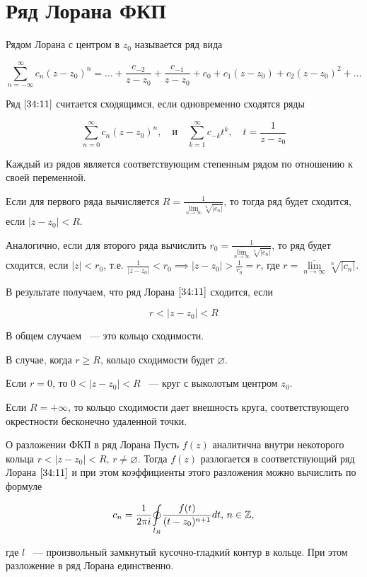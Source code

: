 \documentclass[../../main.tex]{subfiles}
\begin{document}
\section{Ряд Лорана ФКП}

Рядом Лорана с центром в $ z_0 $ называется ряд вида

\begin{equation}\label{34:11}
	\sum\limits_{n = -\infty}^{\infty}c_n(z - z_0)^n = \ldots + \frac{c_{-2}}{z - z_0} + \frac{c_{-1}}{z - z_0} + c_0 + c_1(z - z_0) + c_2(z - z_0)^2 + \ldots
\end{equation}

Ряд $ \eqref{34:11} $ считается сходящимся, если одновременно сходятся ряды 

\[ \sum\limits_{n = 0}^{\infty} c_n(z - z_0)^n, \quad \text{и} \quad \sum\limits_{k = 1}^{\infty} c_{-k}t^k, \quad t = \frac{1}{z - z_0} \]

Каждый из рядов является соответствующим степенным рядом по отношению к своей переменной.

Если для первого ряда вычисляется $ R = \frac{1}{\overline{\underset{n \to \infty}{\lim}} \sqrt[n]{|c_n|}} $, то тогда ряд будет сходится, если $ |z - z_0| < R $.

Аналогично, если для второго ряда вычислить $ r_0 = \frac{1}{\overline{\underset{n \to \infty}{\lim}} \sqrt[n]{|c_n|}} $, то ряд будет сходится, если $ |z| < r_0 $, т.е. $ \frac{1}{|z - z_0|} < r_0 \implies |z - z_0| > \frac{1}{r_0} = r $, где $ r = \overline{\underset{n \to \infty}{\lim}} \sqrt[n]{|c_n|} $.

В результате получаем, что ряд Лорана $ \eqref{34:11} $ сходится, если

\[ r < |z - z_0| < R \]

В общем случаем ~--- это кольцо сходимости.

В случае, когда $ r \geq R $, кольцо сходимости будет $ \varnothing $.

Если $r = 0$, то $ 0 < |z - z_0| < R $ ~--- круг с выколотым центром $z_0$.

Если $ R = +\infty $, то кольцо сходимости дает внешность круга, соответствующего окрестности бесконечно удаленной точки.

\begin{thm}{О разложении ФКП в ряд Лорана}
	Пусть $ f(z) $ аналитична внутри некоторого кольца $ r < |z - z_0| < R,\, r \neq \varnothing $. Тогда $ f(z) $ разлогается в соответствующий ряд Лорана $ \eqref{34:11} $ и при этом коэффициенты этого разложения можно вычислить по формуле
	
	\begin{equation}\label{34:12}
		c_n = \frac{1}{2 \pi i} \underset{l_R}\oint\frac{f(t)}{(t - z_0)^{n + 1}} dt,\, n \in \mathbb{Z},
	\end{equation}
	
	где $ l $ ~--- произвольный замкнутый кусочно-гладкий контур в кольце. При этом разложение в ряд Лорана единственно.
\end{thm}
\end{document}

